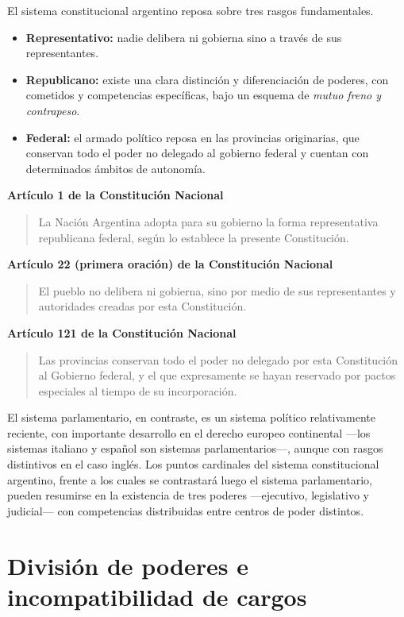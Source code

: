 \documentclass[12pt,oneside]{book}
\newenvironment{normacitada}[1]{%
    \medskip
    \noindent\textbf{#1}\par\smallskip
    \begin{quote}\itshape
}{%
    \end{quote}
    \medskip
}
\begin{document}
El sistema constitucional argentino reposa sobre tres rasgos fundamentales.

\begin{itemize}
\item \textbf{Representativo:} nadie delibera ni gobierna sino a través de sus representantes.
\item \textbf{Republicano:} existe una clara distinción y diferenciación de poderes, con cometidos y competencias específicas, bajo un esquema de \emph{mutuo freno y contrapeso}.
\item \textbf{Federal:} el armado político reposa en las provincias originarias, que conservan todo el poder no delegado al gobierno federal y cuentan con determinados ámbitos de autonomía.
\end{itemize}

\begin{normacitada}{Artículo 1 de la Constitución Nacional}
La Nación Argentina adopta para su gobierno la forma representativa republicana federal, según lo establece la presente Constitución.
\end{normacitada}

\begin{normacitada}{Artículo 22 (primera oración) de la Constitución Nacional}
El pueblo no delibera ni gobierna, sino por medio de sus representantes y autoridades creadas por esta Constitución.
\end{normacitada}

\begin{normacitada}{Artículo 121 de la Constitución Nacional}
Las provincias conservan todo el poder no delegado por esta Constitución al Gobierno federal, y el que expresamente se hayan reservado por pactos especiales al tiempo de su incorporación.
\end{normacitada}

El sistema parlamentario, en contraste, es un sistema político relativamente reciente, con importante desarrollo en el derecho europeo continental —los sistemas italiano y español son sistemas parlamentarios—, aunque con rasgos distintivos en el caso inglés. Los puntos cardinales del sistema constitucional argentino, frente a los cuales se contrastará luego el sistema parlamentario, pueden resumirse en la existencia de tres poderes —ejecutivo, legislativo y judicial— con competencias distribuidas entre centros de poder distintos.

\section{División de poderes e incompatibilidad de cargos}
\end{document}
